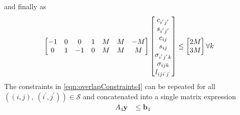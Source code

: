 	and finally as
	\begin{equation}\begin{aligned} 
		\begin{bmatrix} 
			-1 & 0 &  0 & 1 & M & M & -M \\
			 0 & 1 & -1 & 0 & M & M &  M \\
		\end{bmatrix} 
		\begin{bmatrix}
			c_{i^{'}j^{'}}       \\ 
			s_{i^{'}j^{'}}       \\
			c_{ij}               \\
			s_{ij}               \\ 
			\sigma_{i^{'}j^{'}k} \\ 
			\sigma_{ijk}         \\
			l_{iji^{`}j^{`}}     \\
		\end{bmatrix} &\le 
		\begin{bmatrix} 
			2M \\ 
			3M \\
		\end{bmatrix} \forall k
	\end{aligned} \end{equation}
	The constraints in \eqref{eqn:overlapConstraints4} can be repeated for all $\left ( (i,j), \ (i^{'},j^{'}) \right ) \in \mathcal{S}$ and concatenated into a single matrix expression
	\begin{equation}\begin{aligned} 
		A_4\mathbf{y} & \le \mathbf{b}_4 \\
	\end{aligned} \end{equation} 
